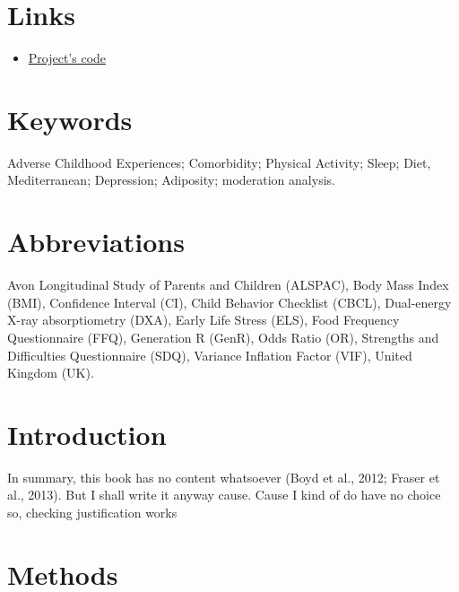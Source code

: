 \documentclass[
  letterpaper,
  DIV=11,
  numbers=noendperiod]{scrreport}
\providecommand{\tightlist}{%
  \setlength{\itemsep}{0pt}\setlength{\parskip}{0pt}}
\begin{document}
\newpage

\section*{Links}\label{links-1}


\begin{itemize}
\tightlist
\item
  \href{https://github.com/SereDef/lifestyle-moderators-project}{Project's
  code}
\end{itemize}

\section*{Keywords}\label{keywords-1}


Adverse Childhood Experiences; Comorbidity; Physical Activity; Sleep;
Diet, Mediterranean; Depression; Adiposity; moderation analysis.

\section*{Abbreviations}\label{abbreviations}


Avon Longitudinal Study of Parents and Children (ALSPAC), Body Mass
Index (BMI), Confidence Interval (CI), Child Behavior Checklist (CBCL),
Dual-energy X-ray absorptiometry (DXA), Early Life Stress (ELS), Food
Frequency Questionnaire (FFQ), Generation R (GenR), Odds Ratio (OR),
Strengths and Difficulties Questionnaire (SDQ), Variance Inflation
Factor (VIF), United Kingdom (UK).

\newpage

\section{Introduction}\label{introduction-1}

In summary, this book has no content whatsoever (Boyd et al., 2012;
Fraser et al., 2013). But I shall write it anyway cause. Cause I kind of
do have no choice so, checking justification works

\section{Methods}\label{methods-1}
\end{document}
